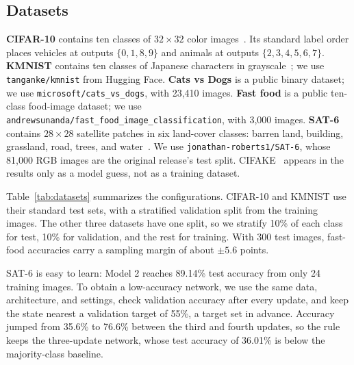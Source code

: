 \documentclass[11pt]{article}
\begin{document}
\subsection{Datasets}

\textbf{CIFAR-10} contains ten classes of $32\times32$ color images~\cite{krizhevsky}. Its standard label order places vehicles at outputs $\{0,1,8,9\}$ and animals at outputs $\{2,3,4,5,6,7\}$. \textbf{KMNIST} contains ten classes of Japanese characters in grayscale~\cite{clanuwat}; we use \nolinkurl{tanganke/kmnist} from Hugging Face. \textbf{Cats vs Dogs} is a public binary dataset; we use \nolinkurl{microsoft/cats_vs_dogs}, with 23,410 images. \textbf{Fast food} is a public ten-class food-image dataset; we use \nolinkurl{andrewsunanda/fast_food_image_classification}, with 3,000 images. \textbf{SAT-6} contains $28\times28$ satellite patches in six land-cover classes: barren land, building, grassland, road, trees, and water~\cite{basu}. We use \nolinkurl{jonathan-roberts1/SAT-6}, whose 81,000 RGB images are the original release's test split. CIFAKE~\cite{bird} appears in the results only as a model guess, not as a training dataset.

Table~\ref{tab:datasets} summarizes the configurations. CIFAR-10 and KMNIST use their standard test sets, with a stratified validation split from the training images. The other three datasets have one split, so we stratify 10\% of each class for test, 10\% for validation, and the rest for training. With 300 test images, fast-food accuracies carry a sampling margin of about $\pm5.6$ points.

SAT-6 is easy to learn: Model 2 reaches 89.14\% test accuracy from only 24 training images. To obtain a low-accuracy network, we use the same data, architecture, and settings, check validation accuracy after every update, and keep the state nearest a validation target of 55\%, a target set in advance. Accuracy jumped from 35.6\% to 76.6\% between the third and fourth updates, so the rule keeps the three-update network, whose test accuracy of 36.01\% is below the majority-class baseline.
\end{document}
